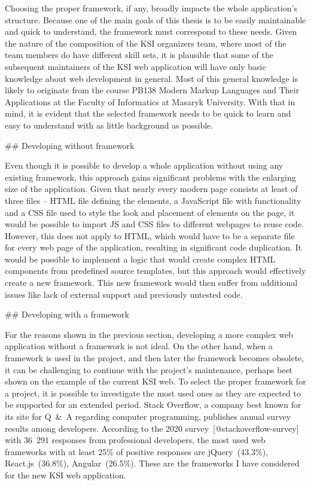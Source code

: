 \documentclass[
  digital, %
  oneside, %
  lof,     %
  nolot,     %
]{fithesis4}
\begin{document}
Choosing the proper framework, if any, broadly impacts the whole application's structure. Because one of the main goals of this thesis is to be easily maintainable and quick to understand, the framework must correspond to these needs. Given the nature of the composition of the KSI organizers team, where most of the team members do have different skill sets, it is plausible that some of the subsequent maintainers of the KSI web application will have only basic knowledge about web development in general. Most of this general knowledge is likely to originate from the course PB138 Modern Markup Languages and Their Applications at the Faculty of Informatics at Masaryk University. With that in mind, it is evident that the selected framework needs to be quick to learn and easy to understand with as little background as possible.

## Developing without framework

Even though it is possible to develop a whole application without using any existing framework, this approach gains significant problems with the enlarging size of the application. Given that nearly every modern page consists at least of three files -- HTML file defining the elements, a JavaScript file with functionality and a CSS file used to style the look and placement of elements on the page, it would be possible to import JS and CSS files to different webpages to reuse code. However, this does not apply to HTML, which would have to be a separate file for every web page of the application, resulting in significant code duplication. It would be possible to implement a logic that would create complex HTML components from predefined source templates, but this approach would effectively create a new framework. This new framework would then suffer from additional issues like lack of external support and previously untested code.

## Developing with a framework

For the reasons shown in the previous section, developing a more complex web application without a framework is not ideal. On the other hand, when a framework is used in the project, and then later the framework becomes obsolete, it can be challenging to continue with the project's maintenance, perhaps best shown on the example of the current KSI web. To select the proper framework for a project, it is possible to investigate the most used ones as they are expected to be supported for an extended period. Stack Overflow, a company best known for its site for Q~\&~A regarding computer programming, publishes annual survey results among developers. According to the 2020 survey~[@stackoverflow-survey] with 36~291 responses from professional developers, the most used web frameworks with at least 25\% of positive responses are jQuery~(43.3\%), React.js~(36.8\%), Angular~(26.5\%). These are the frameworks I have considered for the new KSI web application.
\end{document}

